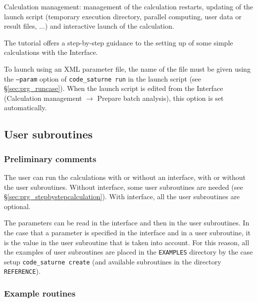 {{{\begin{list}{-}{}
\item Calculation management: management of the calculation restarts,
      updating of the launch script (temporary execution directory, parallel
      computing, user data or result files, ...) and interactive launch of the
      calculation.

\end{list}

The \CS tutorial \cite{tutorial} offers a step-by-step guidance to the setting
up of some simple calculations with the \CS Interface.

To launch \CS using an XML parameter file,
the name of the file must
be given using the \texttt{--param} option of \texttt{code\_saturne run} in
the launch script (see \S\ref{sec:prg_runcase}). When the launch
script is edited from the Interface (Calculation management $\rightarrow$
Prepare batch analysis), this option is set automatically.

\subsection{User subroutines}
\label{sec:prg_ssprgutilis}
\subsubsection{Preliminary comments}

The user can run the calculations with or without an interface, with or
 without the user subroutines. Without interface, some user subroutines
 are needed (see \S\ref{sec:prg_stepbystepcalculation}). With interface,
all the user subroutines are optional.

The parameters can be read in the interface and then in the user
subroutines. In the case that a parameter is specified in the interface
 and in a user subroutine, it is the value in the user subroutine that
 is taken into account. For this reason, all the examples of
 user subroutines are placed in the \texttt{EXAMPLES} directory by the
 case setup \texttt{code\_saturne~create} (and available subroutines in the
 directory \texttt{REFERENCE}).

\subsubsection{Example routines}

}}}
